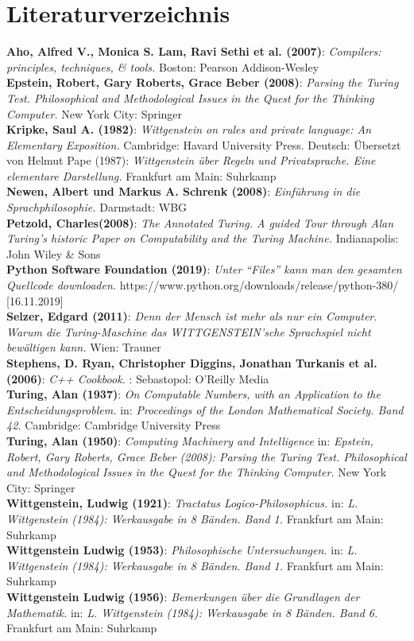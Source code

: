 \documentclass[a4paper,12pt]{article}
\begin{document}
\section*{Literaturverzeichnis}
\textbf{Aho, Alfred V., Monica S. Lam, Ravi Sethi et al. (2007)}: \textit{Compilers: principles, techniques, \& tools.} Boston: Pearson Addison-Wesley \\
\textbf{Epstein, Robert, Gary Roberts, Grace Beber (2008)}: \textit{Parsing the Turing Test. Philosophical and Methodological Issues in the Quest for the Thinking Computer.} New York City: Springer \\
\textbf{Kripke, Saul A. (1982)}: \textit{Wittgenstein on rules and private language: An Elementary Exposition.} Cambridge: Havard University Press. Deutsch: Übersetzt von Helmut Pape (1987): \textit{Wittgenstein über Regeln und Privatsprache. Eine elementare Darstellung.} Frankfurt am Main: Suhrkamp \\
\textbf{Newen, Albert und Markus A. Schrenk (2008)}: \textit{Einführung in die Sprachphilosophie.} Darmstadt: WBG \\
\textbf{Petzold, Charles(2008)}: \textit{The Annotated Turing. A guided Tour through Alan Turing’s historic Paper on Computability and the Turing Machine.} Indianapolis: John Wiley \& Sons \\
\textbf{Python Software Foundation (2019)}: \textit{Unter \enquote{Files} kann man den gesamten Quellcode downloaden.} https://www.python.org/downloads/release/python-380/ [16.11.2019] \\
\textbf{Selzer, Edgard (2011)}: \textit{Denn der Mensch ist mehr als nur ein Computer. Warum die Turing-Maschine das WITTGENSTEIN'sche Sprachspiel nicht bewältigen kann.} Wien: Trauner \\
\textbf{Stephens, D. Ryan, Christopher Diggins, Jonathan Turkanis et al. (2006)}: \textit{C++ Cookbook.} : Sebastopol: O'Reilly Media \\
\textbf{Turing, Alan (1937)}: \textit{On Computable Numbers, with an Application to the Entscheidungsproblem.} in: \textit{Proceedings of the London Mathematical Society. Band 42.} Cambridge: Cambridge University Press \\
\textbf{Turing, Alan (1950)}: \textit{Computing Machinery and Intelligence} in: \textit{Epstein, Robert, Gary Roberts, Grace Beber (2008): Parsing the Turing Test. Philosophical and Methodological Issues in the Quest for the Thinking Computer.} New York City: Springer \\
\textbf{Wittgenstein, Ludwig (1921)}: \textit{Tractatus Logico-Philosophicus.} in: \textit{L. Wittgenstein (1984): Werkausgabe in 8 Bänden. Band 1.} Frankfurt am Main: Suhrkamp \\
\textbf{Wittgenstein Ludwig (1953)}: \textit{Philosophische Untersuchungen.} in: \textit{L. Wittgenstein (1984): Werkausgabe in 8 Bänden. Band 1.} Frankfurt am Main: Suhrkamp \\
\textbf{Wittgenstein Ludwig (1956)}: \textit{Bemerkungen über die Grundlagen der Mathematik.} in: \textit{L. Wittgenstein (1984): Werkausgabe in 8 Bänden. Band 6.} Frankfurt am Main: Suhrkamp \\
\end{document}
